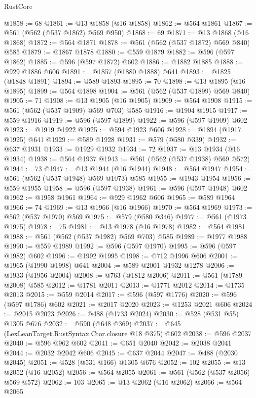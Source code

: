 \begin{lexlean}{RustCore}
\begin{coremodule}
@1858 := 68
@1861 := @13 @1858 (@16 @1858)
@1862 := @564 @1861
@1867 := @561 (@562 (@537 @1862) @569 @950)
@1868 := 69
@1871 := @13 @1868 (@16 @1868)
@1872 := @564 @1871
@1878 := @561 (@562 (@537 @1872) @569 @840) @585
@1879 := @1867 @1878
@1880 := @559 @1879
@1882 := @596 (@597 @1862)
@1885 := @596 (@597 @1872) @602
@1886 := @1882 @1885
@1888 := @929 @1886 @606
@1891 := @1857 (@1880 @1888) @641
@1893 := @1825 (@1848 @1891)
@1894 := @589 @1893
@1895 := 70
@1898 := @13 @1895 (@16 @1895)
@1899 := @564 @1898
@1904 := @561 (@562 (@537 @1899) @569 @840)
@1905 := 71
@1908 := @13 @1905 (@16 @1905)
@1909 := @564 @1908
@1915 := @561 (@562 (@537 @1909) @569 @703) @585
@1916 := @1904 @1915
@1917 := @559 @1916
@1919 := @596 (@597 @1899)
@1922 := @596 (@597 @1909) @602
@1923 := @1919 @1922
@1925 := @594 @1923 @606
@1928 := @1894 (@1917 @1925) @641
@1929 := @589 @1928
@1931 := @579 (@580 @339)
@1932 := @637 @1931
@1933 := @1929 @1932
@1934 := 72
@1937 := @13 @1934 (@16 @1934)
@1938 := @564 @1937
@1943 := @561 (@562 (@537 @1938) @569 @572)
@1944 := 73
@1947 := @13 @1944 (@16 @1944)
@1948 := @564 @1947
@1954 := @561 (@562 (@537 @1948) @569 @1073) @585
@1955 := @1943 @1954
@1956 := @559 @1955
@1958 := @596 (@597 @1938)
@1961 := @596 (@597 @1948) @602
@1962 := @1958 @1961
@1964 := @929 @1962 @606
@1965 := @589 @1964
@1966 := 74
@1969 := @13 @1966 (@16 @1966)
@1970 := @564 @1969
@1973 := @562 (@537 @1970) @569
@1975 := @579 (@580 @346)
@1977 := @561 (@1973 @1975)
@1978 := 75
@1981 := @13 @1978 (@16 @1978)
@1982 := @564 @1981
@1988 := @561 (@562 (@537 @1982) @569 @703) @585
@1989 := @1977 @1988
@1990 := @559 @1989
@1992 := @596 (@597 @1970)
@1995 := @596 (@597 @1982) @602
@1996 := @1992 @1995
@1998 := @712 @1996 @606
@2001 := @1965 (@1990 @1998) @641
@2004 := @589 @2001 @1932 @1278
@2006 := @1933 (@1956 @2004)
@2008 := @763 (@1812 @2006)
@2011 := @561 (@1789 @2008) @585
@2012 := @1781 @2011
@2013 := @1771 @2012
@2014 := @1735 @2013
@2015 := @559 @2014
@2017 := @596 (@597 @1776)
@2020 := @596 (@597 @1786) @602
@2021 := @2017 @2020
@2023 := @1253 @2021 @606
@2024 := @2015 @2023
@2026 := @488 (@1733 @2024)
@2030 := @528 (@531 @55) @1305 @676
@2032 := @590 (@648 @369)
@2037 := @645 (LexLeanTarget.RustSyntax.Ctor.closure @18 @375) @602
@2038 := @596 @2037
@2040 := @596 @962 @602
@2041 := @651 @2040
@2042 := @2038 @2041
@2044 := @2032 @2042 @606
@2045 := @637 @2044
@2047 := @488 (@2030 @2045)
@2051 := @528 (@531 @166) @1305 @676
@2052 := 102
@2055 := @13 @2052 (@16 @2052)
@2056 := @564 @2055
@2061 := @561 (@562 (@537 @2056) @569 @572)
@2062 := 103
@2065 := @13 @2062 (@16 @2062)
@2066 := @564 @2065

\end{coremodule}
\end{lexlean}
